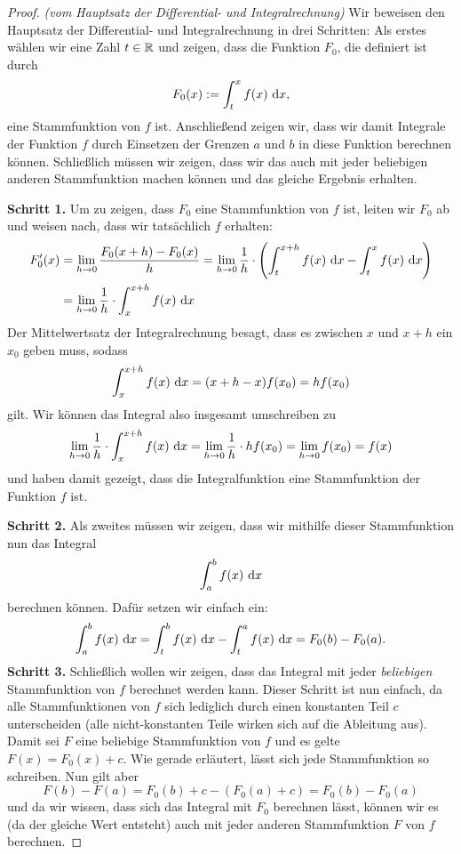 \documentclass[../../main.tex]{subfiles}
\begin{document}
\begin{proof}
    \emph{(vom Hauptsatz der Differential- und Integralrechnung)}
    Wir beweisen den Hauptsatz der Differential- und Integralrechnung in drei Schritten: Als erstes wählen wir eine
    Zahl $t\in\mathbb{R}$ und zeigen, dass 
    die Funktion $F_0$, die definiert ist durch
    \[F_0(x):=\int_t^x f(x)\mathop{}\mathrm{d} x,\]
    eine Stammfunktion von $f$ ist. Anschließend zeigen wir, dass wir damit Integrale der Funktion $f$ durch 
    Einsetzen der Grenzen $a$ und $b$ in diese Funktion berechnen können. Schließlich müssen wir zeigen, dass wir das 
    auch mit jeder beliebigen anderen Stammfunktion machen können und das gleiche Ergebnis erhalten.
    
    \textbf{Schritt 1.} Um zu zeigen, dass $F_0$ eine Stammfunktion von $f$ ist, leiten wir $F_0$ ab und weisen nach, dass wir 
    tatsächlich $f$ erhalten:
    \begin{align*}
        F_0'(x)&=\lim_{h\rightarrow 0} \frac{F_0(x+h)-F_0(x)}{h}=\lim_{h\rightarrow 0}\frac{1}{h}\cdot\Biggl(\int_t^{x+h} f(x)\mathop{}\mathrm{d} x-\int_t^x f(x)\mathop{}\mathrm{d} x\Biggr)\\
        &=\lim_{h\rightarrow 0}\frac{1}{h}\cdot\int_x^{x+h} f(x)\mathop{}\mathrm{d} x
    \end{align*}
    Der Mittelwertsatz der Integralrechnung besagt, dass es zwischen $x$ und $x+h$ ein $x_0$ geben muss, sodass 
    \[\int_x^{x+h} f(x)\mathop{}\mathrm{d} x=(x+h-x)f(x_0)=hf(x_0)\]
    gilt. Wir können das Integral also insgesamt umschreiben zu
    \[\lim_{h\rightarrow 0}\frac{1}{h}\cdot\int_x^{x+h} f(x)\mathop{}\mathrm{d} x=\lim_{h\rightarrow 0}\frac{1}{h}\cdot hf(x_0)=\lim_{h\rightarrow 0} f(x_0)=f(x)\]
    und haben damit gezeigt, dass die Integralfunktion eine Stammfunktion der Funktion $f$ ist.
    
    \textbf{Schritt 2.} Als zweites müssen wir zeigen, dass wir mithilfe dieser Stammfunktion nun das Integral \[\int_a^b f(x)\mathop{}\mathrm{d} x\] 
    berechnen können. Dafür setzen wir einfach ein:
    \[\int_a^b f(x)\mathop{}\mathrm{d} x=\int_t^b f(x)\mathop{}\mathrm{d} x-\int_t^a f(x)\mathop{}\mathrm{d} x=F_0(b)-F_0(a).\]
    \textbf{Schritt 3.} Schließlich wollen wir zeigen, dass das Integral mit jeder \textit{beliebigen} Stammfunktion von $f$ berechnet 
    werden kann. Dieser Schritt ist nun einfach, da alle Stammfunktionen von $f$ sich lediglich durch einen konstanten 
    Teil $c$ unterscheiden (alle nicht-konstanten Teile wirken sich auf die Ableitung aus). Damit sei $F$ eine beliebige 
    Stammfunktion von $f$ und es gelte $F(x)=F_0(x)+c$. Wie gerade erläutert, lässt sich jede Stammfunktion so schreiben. 
    Nun gilt aber
    \[F(b)-F(a)=F_0(b)+c-(F_0(a)+c)=F_0(b)-F_0(a)\]
    und da wir wissen, dass sich das Integral mit $F_0$ berechnen lässt, können wir es (da der gleiche Wert entsteht) 
    auch mit jeder anderen Stammfunktion $F$ von $f$ berechnen.
    \end{proof}
\end{document}
